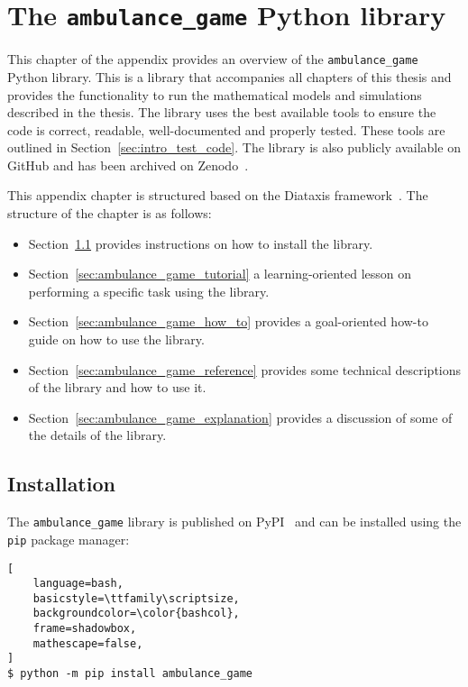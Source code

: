 \chapter{The \texttt{ambulance\_game} Python library}
\label{appendix:ambulance_game}

This chapter of the appendix provides an overview of the
\texttt{ambulance\_game} Python library.
This is a library that accompanies all chapters of this thesis and provides
the functionality to run the mathematical models and simulations described
in the thesis.
The library uses the best available tools to ensure the code is correct,
readable, well-documented and properly tested.
These tools are outlined in Section~\ref{sec:intro_test_code}.
The library is also publicly available on GitHub and has been archived on
Zenodo~\cite{ambulance_game_github_repo}.

This appendix chapter is structured based on the Diataxis
framework~\cite{Procida_Diataxis_documentation_framework}.
The structure of the chapter is as follows:

\begin{itemize}
    \item Section~\ref{sec:ambulance_game_installation} provides instructions
        on how to install the library.
    \item Section~\ref{sec:ambulance_game_tutorial} a learning-oriented lesson
        on performing a specific task using the library.
    \item Section~\ref{sec:ambulance_game_how_to} provides a goal-oriented
        how-to guide on how to use the library.
    \item Section~\ref{sec:ambulance_game_reference} provides some technical
        descriptions of the library and how to use it.
    \item Section~\ref{sec:ambulance_game_explanation} provides a discussion
        of some of the details of the library.
\end{itemize}


\section{Installation}\label{sec:ambulance_game_installation}

The \texttt{ambulance\_game} library is published on PyPI~\cite{pypi}
and can be installed using the \texttt{pip} package manager:

\begin{lstlisting}[
    language=bash,
    basicstyle=\ttfamily\scriptsize,
    backgroundcolor=\color{bashcol},
    frame=shadowbox,
    mathescape=false,
]
$ python -m pip install ambulance_game
\end{lstlisting}


